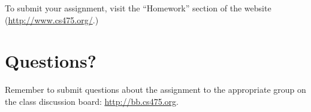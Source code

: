 \documentclass[11pt]{article}
\begin{document}
To submit your assignment, visit the ``Homework'' section of the website (\href{http://www.cs475.org/}{http://www.cs475.org/}.)

\section{Questions?}
Remember to submit questions about the assignment to the appropriate group on the class discussion board: \href{http://bb.cs475.org/}{http://bb.cs475.org}.
\end{document}
